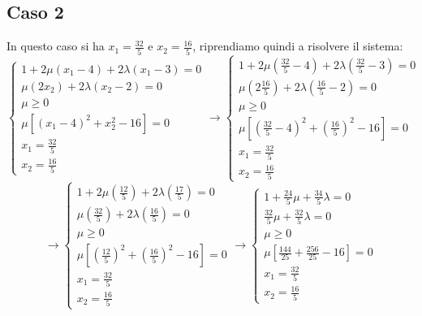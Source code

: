 \documentclass[a4paper,12pt, oneside]{book}
\begin{document}
\subsection{Caso 2}
In questo caso si ha $x_1=\frac{32}{5}$ e $x_2=\frac{16}{5}$,
riprendiamo quindi a risolvere il sistema:
\[\begin{cases}
    1+2\mu(x_1-4)+2\lambda(x_1-3)=0\\
    \mu(2x_2)+2\lambda(x_2-2)=0\\
    \mu\geq 0\\
    \mu[(x_1-4)^2+x_2^2-16]=0\\
    x_1=\frac{32}{5} \\
    x_2=\frac{16}{5}
  \end{cases}\to
  \begin{cases}
    1+2\mu(\frac{32}{5}-4)+2\lambda(\frac{32}{5}-3)=0\\
    \mu(2\frac{16}{5})+2\lambda(\frac{16}{5}-2)=0\\
    \mu\geq 0\\
    \mu[(\frac{32}{5}-4)^2+\left(\frac{16}{5}\right)^2-16]=0\\
    x_1=\frac{32}{5} \\
    x_2=\frac{16}{5}
  \end{cases}
\]
\[\to
  \begin{cases}
    1+2\mu(\frac{12}{5})+2\lambda(\frac{17}{5})=0\\
    \mu(\frac{32}{5})+2\lambda(\frac{16}{5})=0\\
    \mu\geq 0\\
    \mu[(\frac{12}{5})^2+\left(\frac{16}{5}\right)^2-16]=0\\
    x_1=\frac{32}{5} \\
    x_2=\frac{16}{5}
  \end{cases}\to
  \begin{cases}
    1+\frac{24}{5}\mu+\frac{34}{5}\lambda=0\\
    \frac{32}{5}\mu+\frac{32}{5}\lambda=0\\
    \mu\geq 0\\
    \mu[\frac{144}{25}+\frac{256}{25}-16]=0\\
    x_1=\frac{32}{5} \\
    x_2=\frac{16}{5}
  \end{cases}
\]
\end{document}
